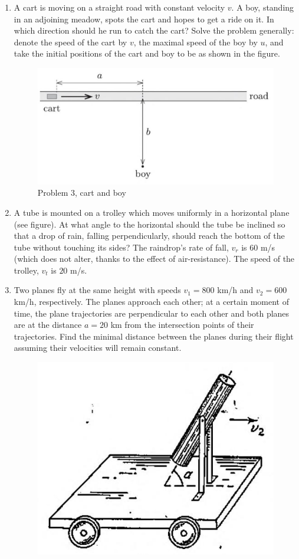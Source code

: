 \documentclass{article}
\begin{document}
\begin{enumerate}
    \item A cart is moving on a straight road with constant velocity $v$. A boy, standing in an adjoining meadow, spots the cart and hopes to get a ride on it. In which direction should he run to catch the cart? Solve the problem generally: denote the speed of the cart by $v$, the maximal speed of the boy by $u$, and take the initial positions of the cart and boy to be as shown in the figure.
\begin{figure}
    \centering
    \includegraphics[width=0.5\linewidth]{cart and boy}
    \caption{Problem 3, cart and boy}
    \label{fig:enter-label}
\end{figure}
    \item A tube is mounted on a trolley which moves uniformly in a horizontal plane (see figure). At what angle to the horizontal should the tube be inclined so that a drop of rain, falling perpendicularly, should reach the bottom of the tube without touching its sides? The raindrop's rate of fall, $v_r$ is $60$ m/s (which does not alter, thanks to the effect of air-resistance). The speed of the trolley, $v_t$ is $20$ m/s.
    \item Two planes fly at the same height with speeds $v_1 = 800$ km/h and $v_2 = 600$ km/h, respectively. The planes approach each other; at a certain moment of time, the plane trajectories are perpendicular to each other and both planes are at the distance $a = 20$ km from the intersection points of their trajectories. Find the minimal distance between the planes during their flight assuming their velocities will remain constant.
    \begin{figure}
        \centering
        \includegraphics[width=0.5\linewidth]{trolley in rain}

\end{figure}
\end{enumerate}
\end{document}
